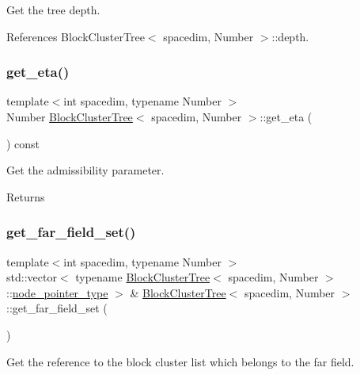 Get the tree depth. 

References Block\+Cluster\+Tree$<$ spacedim, Number $>$\+::depth.

\mbox{\label{classBlockClusterTree_a312d01ddb6cf5560d84abf7d254fa2c3}} 
\subsubsection{\texorpdfstring{get\+\_\+eta()}{get\_eta()}}
{\footnotesize\ttfamily template$<$int spacedim, typename Number $>$ \\
Number \hyperlink{classBlockClusterTree}{Block\+Cluster\+Tree}$<$ spacedim, Number $>$\+::get\+\_\+eta (\begin{DoxyParamCaption}{ }\end{DoxyParamCaption}) const}

Get the admissibility parameter. \begin{DoxyReturn}{Returns}

\end{DoxyReturn}
\mbox{\label{classBlockClusterTree_a2980726dc3789773b5cd3c04df5e69a3}} 
\subsubsection{\texorpdfstring{get\+\_\+far\+\_\+field\+\_\+set()}{get\_far\_field\_set()}\hspace{0.1cm}{\footnotesize\ttfamily [1/2]}}
{\footnotesize\ttfamily template$<$int spacedim, typename Number $>$ \\
std\+::vector$<$ typename \hyperlink{classBlockClusterTree}{Block\+Cluster\+Tree}$<$ spacedim, Number $>$\+::\hyperlink{classTreeNode}{node\+\_\+pointer\+\_\+type} $>$ \& \hyperlink{classBlockClusterTree}{Block\+Cluster\+Tree}$<$ spacedim, Number $>$\+::get\+\_\+far\+\_\+field\+\_\+set (\begin{DoxyParamCaption}{ }\end{DoxyParamCaption})}

Get the reference to the block cluster list which belongs to the far field. \mbox{\label{classBlockClusterTree_a93763855c84100e1a9da3080737295f4}} 
